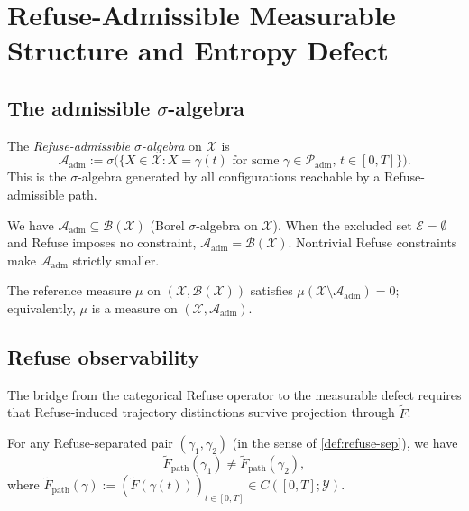 \documentclass[12pt, oneside]{memoir}
\newcommand{\X}{\mathcal{X}}
\newcommand{\Ft}{\widetilde{F}}
\newcommand{\Fpath}{\widetilde{F}_{\mathrm{path}}}
\newcommand{\Padm}{\mathcal{P}_{\mathrm{adm}}}
\newcommand{\Aadm}{\mathcal{A}_{\mathrm{adm}}}
\begin{document}
\chapter{Refuse-Admissible Measurable Structure and Entropy Defect}
\label{ch:defect}

\section{The admissible $\sigma$-algebra}

\begin{definition}
\label{def:sigma-alg}
The \emph{Refuse-admissible $\sigma$-algebra} on $\X$ is
\[
  \Aadm := \sigma\bigl(\{X \in \X : X = \gamma(t)
    \text{ for some } \gamma \in \Padm,\, t \in [0,T]\}\bigr).
\]
This is the $\sigma$-algebra generated by all configurations reachable by a
Refuse-admissible path.
\end{definition}

We have $\Aadm \subseteq \mathcal{B}(\X)$ (Borel $\sigma$-algebra on $\X$).  When the
excluded set $\mathcal{E} = \emptyset$ and Refuse imposes no constraint, $\Aadm =
\mathcal{B}(\X)$.  Nontrivial Refuse constraints make $\Aadm$ strictly smaller.

\begin{assumption}
\label{ass:mu}
The reference measure $\mu$ on $(\X, \mathcal{B}(\X))$ satisfies $\mu(\X \setminus
\Aadm) = 0$; equivalently, $\mu$ is a measure on $(\X, \Aadm)$.
\end{assumption}

\section{Refuse observability}

The bridge from the categorical Refuse operator to the measurable defect requires that
Refuse-induced trajectory distinctions survive projection through $\Ft$.

\begin{assumption}
\label{ass:obs}
For any Refuse-separated pair $(\gamma_1, \gamma_2)$ (in the sense of
\cref{def:refuse-sep}), we have
\[
  \Fpath(\gamma_1) \ne \Fpath(\gamma_2),
\]
where $\Fpath(\gamma) := (\Ft(\gamma(t)))_{t \in [0,T]} \in C([0,T];\mathcal{Y})$.
\end{assumption}
\end{document}
